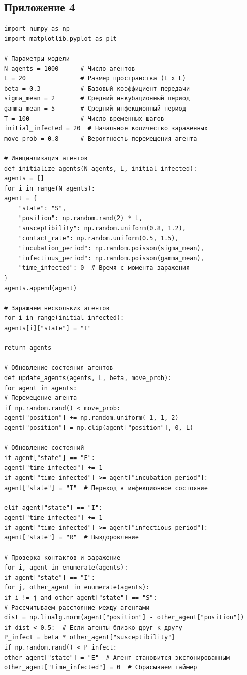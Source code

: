 \documentclass[a4paper, 14pt]{extreport}
\numberwithin{equation}{section}
\begin{document}
\subsection*{Приложение 4}
\begin{verbatim}
import numpy as np
import matplotlib.pyplot as plt

# Параметры модели
N_agents = 1000      # Число агентов
L = 20               # Размер пространства (L x L)
beta = 0.3           # Базовый коэффициент передачи
sigma_mean = 2       # Средний инкубационный период
gamma_mean = 5       # Средний инфекционный период
T = 100              # Число временных шагов
initial_infected = 20  # Начальное количество зараженных
move_prob = 0.8      # Вероятность перемещения агента

# Инициализация агентов
def initialize_agents(N_agents, L, initial_infected):
agents = []
for i in range(N_agents):
agent = {
	"state": "S", 
	"position": np.random.rand(2) * L,  
	"susceptibility": np.random.uniform(0.8, 1.2), 
	"contact_rate": np.random.uniform(0.5, 1.5), 
	"incubation_period": np.random.poisson(sigma_mean), 
	"infectious_period": np.random.poisson(gamma_mean), 
	"time_infected": 0  # Время с момента заражения
}
agents.append(agent)

# Заражаем нескольких агентов
for i in range(initial_infected):
agents[i]["state"] = "I"

return agents

# Обновление состояния агентов
def update_agents(agents, L, beta, move_prob):
for agent in agents:
# Перемещение агента
if np.random.rand() < move_prob:
agent["position"] += np.random.uniform(-1, 1, 2)
agent["position"] = np.clip(agent["position"], 0, L)

# Обновление состояний
if agent["state"] == "E":
agent["time_infected"] += 1
if agent["time_infected"] >= agent["incubation_period"]:
agent["state"] = "I"  # Переход в инфекционное состояние

elif agent["state"] == "I":
agent["time_infected"] += 1
if agent["time_infected"] >= agent["infectious_period"]:
agent["state"] = "R"  # Выздоровление

# Проверка контактов и заражение
for i, agent in enumerate(agents):
if agent["state"] == "I":
for j, other_agent in enumerate(agents):
if i != j and other_agent["state"] == "S":
# Рассчитываем расстояние между агентами
dist = np.linalg.norm(agent["position"] - other_agent["position"])
if dist < 0.5:  # Если агенты близко друг к другу
P_infect = beta * other_agent["susceptibility"]
if np.random.rand() < P_infect:
other_agent["state"] = "E"  # Агент становится экспонированным
other_agent["time_infected"] = 0  # Сбрасываем таймер


\end{verbatim}
\end{document}
